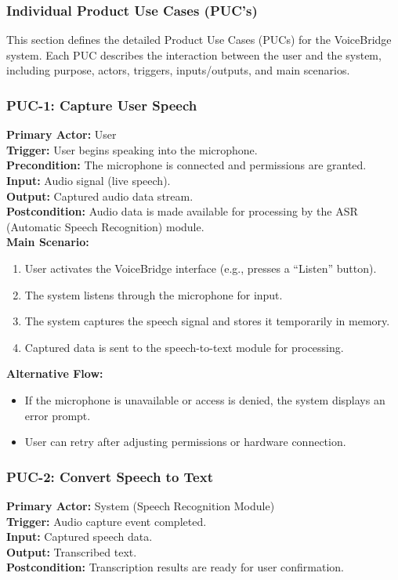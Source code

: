 \documentclass[11pt]{article}
\begin{document}
\subsubsection{Individual Product Use Cases (PUC's)}

This section defines the detailed Product Use Cases (PUCs) for the VoiceBridge system. Each PUC describes the interaction between the user and the system, including purpose, actors, triggers, inputs/outputs, and main scenarios.

\subsubsection*{PUC-1: Capture User Speech}
\textbf{Primary Actor:} User \\
\textbf{Trigger:} User begins speaking into the microphone. \\
\textbf{Precondition:} The microphone is connected and permissions are granted. \\
\textbf{Input:} Audio signal (live speech). \\
\textbf{Output:} Captured audio data stream. \\
\textbf{Postcondition:} Audio data is made available for processing by the ASR (Automatic Speech Recognition) module. \\

\textbf{Main Scenario:}
\begin{enumerate}
  \item User activates the VoiceBridge interface (e.g., presses a “Listen” button).
  \item The system listens through the microphone for input.
  \item The system captures the speech signal and stores it temporarily in memory.
  \item Captured data is sent to the speech-to-text module for processing.
\end{enumerate}

\textbf{Alternative Flow:}
\begin{itemize}
  \item If the microphone is unavailable or access is denied, the system displays an error prompt.
  \item User can retry after adjusting permissions or hardware connection.
\end{itemize}

\bigskip

\subsubsection*{PUC-2: Convert Speech to Text}
\textbf{Primary Actor:} System (Speech Recognition Module) \\
\textbf{Trigger:} Audio capture event completed. \\
\textbf{Input:} Captured speech data. \\
\textbf{Output:} Transcribed text. \\
\textbf{Postcondition:} Transcription results are ready for user confirmation. \\
\end{document}
